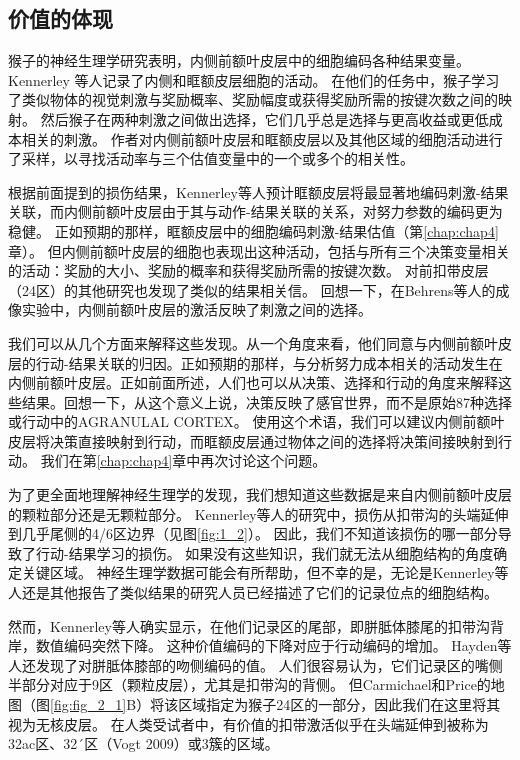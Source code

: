 \subsection{价值的体现}
猴子的神经生理学研究表明，内侧前额叶皮层中的细胞编码各种结果变量。 Kennerley 等人\cite{kennerley2009evaluating}记录了内侧和眶额皮层细胞的活动。
在他们的任务中，猴子学习了类似物体的视觉刺激与奖励概率、奖励幅度或获得奖励所需的按键次数之间的映射。
然后猴子在两种刺激之间做出选择，它们几乎总是选择与更高收益或更低成本相关的刺激。
作者对内侧前额叶皮层和眶额皮层以及其他区域的细胞活动进行了采样，以寻找活动率与三个估值变量中的一个或多个的相关性。\par
根据前面提到的损伤结果，Kennerley等人预计眶额皮层将最显著地编码刺激-结果关联，而内侧前额叶皮层由于其与动作-结果关联的关系，对努力参数的编码更为稳健。
正如预期的那样，眶额皮层中的细胞编码刺激-结果估值（第\ref{chap:chap4}章）。
但内侧前额叶皮层的细胞也表现出这种活动，包括与所有三个决策变量相关的活动：奖励的大小、奖励的概率和获得奖励所需的按键次数。
对前扣带皮层（24区）的其他研究也发现了类似的结果相关信\cite{seo2007temporal,hayden2010neurons}。
回想一下，在Behrens等人\cite{behrens2007learning}的成像实验中，内侧前额叶皮层的激活反映了刺激之间的选择。\par
我们可以从几个方面来解释这些发现。从一个角度来看，他们同意与内侧前额叶皮层的行动-结果关联的归因。正如预期的那样，与分析努力成本相关的活动发生在内侧前额叶皮层。正如前面所述，人们也可以从决策、选择和行动的角度来解释这些结果。回想一下，从这个意义上说，决策反映了感官世界，而不是原始87种选择或行动中的AGRANULAL CORTEX\cite{schall1991neuronal}。
使用这个术语，我们可以建议内侧前额叶皮层将决策直接映射到行动，而眶额皮层通过物体之间的选择将决策间接映射到行动。
我们在第\ref{chap:chap4}章中再次讨论这个问题。\par
为了更全面地理解神经生理学的发现，我们想知道这些数据是来自内侧前额叶皮层的颗粒部分还是无颗粒部分。
Kennerley等人\cite{kennerley2006optimal}的研究中，损伤从扣带沟的头端延伸到几乎尾侧的4/6区边界（见图\ref{fig:1_2}）。
因此，我们不知道该损伤的哪一部分导致了行动-结果学习的损伤。
如果没有这些知识，我们就无法从细胞结构的角度确定关键区域。
神经生理学数据可能会有所帮助，但不幸的是，无论是Kennerley等人\cite{kennerley2009evaluating}还是其他报告了类似结果的研究人员\cite{seo2007temporal,hayden2011neuronal}已经描述了它们的记录位点的细胞结构。\par


然而，Kennerley等人确实显示，在他们记录区的尾部，即胼胝体膝尾的扣带沟背岸，数值编码突然下降。
这种价值编码的下降对应于行动编码的增加。
Hayden等人还发现了对胼胝体膝部的吻侧编码的值。
人们很容易认为，它们记录区的嘴侧半部分对应于9区（颗粒皮层），尤其是扣带沟的背侧。
但Carmichael和Price的地图（图\ref{fig:fig_2_1}B）将该区域指定为猴子24区的一部分，因此我们在这里将其视为无核皮层。
在人类受试者中，有价值的扣带激活似乎在头端延伸到被称为32ac区\cite{Öngür et al. 2003}、32´区（Vogt 2009）或3簇\cite{Beckmann et al 2009}的区域。\par


